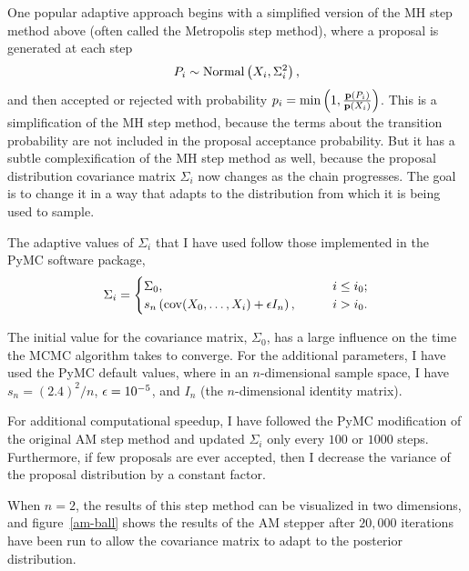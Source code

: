 One popular adaptive approach begins with a simplified version of the MH
step method above (often called the Metropolis step method), where a
proposal is generated at each step
\[
P_i \sim \operatorname{Normal}\left(X_i, \Sigma^2_i\right),
\]
and then accepted or rejected with probability $p_i = \min\left(1,
\frac{\mathbf{p}(P_i)}{\mathbf{p}(X_i)}\right)$.  This is a simplification of
the MH step method, because the terms about the transition probability
are not included in the proposal acceptance probability.  But it has a
subtle complexification of the MH step method as well, because the
proposal distribution covariance matrix $\Sigma_i$ now changes
as the chain progresses.  The goal is to change it in a way that
adapts to the distribution from which it is being used to sample.

The adaptive values of $\Sigma_i$ that I have used follow those
implemented in the PyMC software package,\cite{patil_pymc:_2010}
\[
\Sigma_i = \begin{cases}
\Sigma_0, &\qquad i \leq i_0;\\
s_n \left(\operatorname{cov}(X_0, \ldots, X_i) + \epsilon I_n\right), &\qquad i > i_0.
\end{cases}
\]

The initial value for the covariance matrix, $\Sigma_0$, has a large
influence on the time the MCMC algorithm takes to converge.
For the additional parameters, I have used the PyMC default values,
where in an $n$-dimensional sample space, I have $s_n = (2.4)^2/n$, $\epsilon
= 10^{-5}$, and $I_n$ (the $n$-dimensional identity matrix).

For additional computational speedup, I have followed the PyMC
modification of the original AM step method and updated $\Sigma_i$ only every
$100$ or $1000$ steps.  Furthermore, if few proposals are
ever accepted, then I decrease the variance of the
proposal distribution by a constant factor.

When $n=2$, the results of this step method can be visualized in two
dimensions, and figure~\ref{am-ball} shows the results of the AM
stepper after $20,000$ iterations have been run to allow the covariance
matrix to adapt to the posterior distribution.


